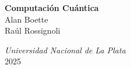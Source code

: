 \begin{titlepage}
 \begin{center}
        \null\vspace{2pc}
%
           {\Huge\textbf{\color{pan323C} Computación Cuántica}} 
           \vspace{2pc}
        \vspace{4pc}
        \vspace{4pc}
%
%
        \vspace{20pc}
%
         {} \\
         \vspace{.5pc}
         {\large  Alan Boette} \\
         \vspace{.5pc}
         {\large  Raúl Rossignoli} \\
    
         \vspace{.5pc}
        \vspace{7pc}
%
       
%
%
        \textit{
        Universidad Nacional de La Plata \\
        }
         {\large 2025} \\
    \end{center}
     \makeatother
\end{titlepage}

\newpage
\null
\thispagestyle{empty}
\newpage

